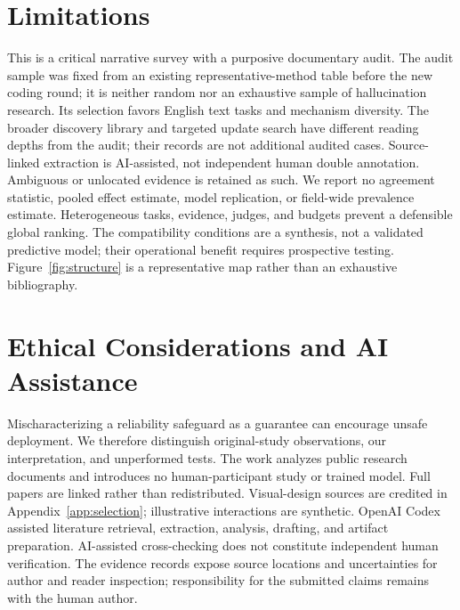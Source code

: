 \documentclass[11pt]{article}
\begin{document}
\section*{Limitations}
This is a critical narrative survey with a purposive documentary audit. The audit sample was fixed from an existing representative-method table before the new coding round; it is neither random nor an exhaustive sample of hallucination research. Its selection favors English text tasks and mechanism diversity. The broader discovery library and targeted update search have different reading depths from the audit; their records are not additional audited cases. Source-linked extraction is AI-assisted, not independent human double annotation. Ambiguous or unlocated evidence is retained as such. We report no agreement statistic, pooled effect estimate, model replication, or field-wide prevalence estimate. Heterogeneous tasks, evidence, judges, and budgets prevent a defensible global ranking. The compatibility conditions are a synthesis, not a validated predictive model; their operational benefit requires prospective testing. Figure~\ref{fig:structure} is a representative map rather than an exhaustive bibliography.
\section*{Ethical Considerations and AI Assistance}
Mischaracterizing a reliability safeguard as a guarantee can encourage unsafe deployment. We therefore distinguish original-study observations, our interpretation, and unperformed tests. The work analyzes public research documents and introduces no human-participant study or trained model. Full papers are linked rather than redistributed. Visual-design sources are credited in Appendix~\ref{app:selection}; illustrative interactions are synthetic. OpenAI Codex assisted literature retrieval, extraction, analysis, drafting, and artifact preparation. AI-assisted cross-checking does not constitute independent human verification. The evidence records expose source locations and uncertainties for author and reader inspection; responsibility for the submitted claims remains with the human author.
\clearpage

\clearpage
\appendix

\end{document}
